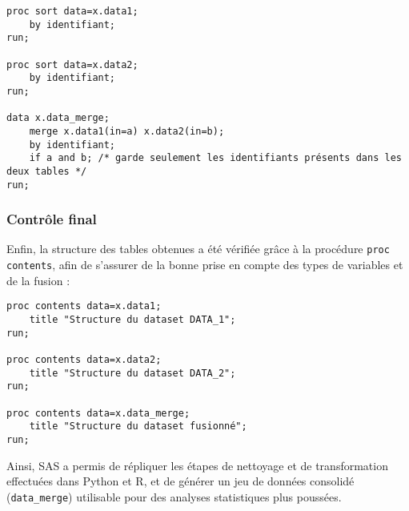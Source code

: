\begin{lstlisting}[caption=Fusion des deux tables dans SAS]
proc sort data=x.data1;
    by identifiant;
run;

proc sort data=x.data2;
    by identifiant;
run;

data x.data_merge;
    merge x.data1(in=a) x.data2(in=b);
    by identifiant;
    if a and b; /* garde seulement les identifiants présents dans les deux tables */
run;
\end{lstlisting}

\subsubsection{Contrôle final}
Enfin, la structure des tables obtenues a été vérifiée grâce à la procédure \texttt{proc contents}, afin de s'assurer de la bonne prise en compte des types de variables et de la fusion :

\begin{lstlisting}[caption=Inspection des tables SAS]
proc contents data=x.data1;
    title "Structure du dataset DATA_1";
run;

proc contents data=x.data2;
    title "Structure du dataset DATA_2";
run;

proc contents data=x.data_merge;
    title "Structure du dataset fusionné";
run;
\end{lstlisting}

Ainsi, SAS a permis de répliquer les étapes de nettoyage et de transformation effectuées dans Python et R, et de générer un jeu de données consolidé (\texttt{data\_merge}) utilisable pour des analyses statistiques plus poussées.
